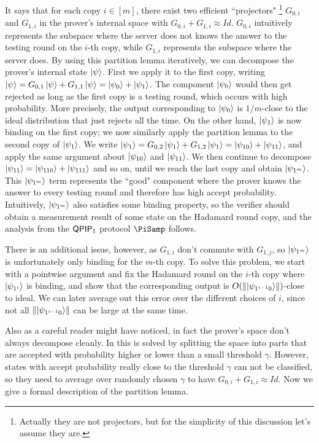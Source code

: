It says that for each copy $i\in[m]$, there exist two efficient ``projectors" \footnote{Actually they are not projectors, but for the simplicity of this discussion let's assume they are.} $G_{0,i}$ and $G_{1,i}$ in the prover's internal space with $G_{0,i}+G_{1,i} \approx Id$.
$G_{0,i}$ intuitively represents the subspace where the server does not knows the answer to the testing round on the $i$-th copy, while $G_{1,i}$ represents the subspace where the server does.
By using this partition lemma iteratively, we can decompose the prover's internal state $\ket{\psi}$.
First we apply it to the first copy, writing $\ket{\psi}=G_{0,1}\ket{\psi}+G_{1,1}\ket{\psi}=\ket{\psi_0}+\ket{\psi_1}$.
The component $\ket{\psi_0}$ would then get rejected as long as the first copy is a testing round,
which occurs with high probability.
More precisely, the output corresponding to $\ket{\psi_0}$ is $1/m$-close to the ideal distribution that just rejects all the time.
On the other hand, $\ket{\psi_1}$ is now binding on the first copy;
we now similarly apply the partition lemma to the second copy of $\ket{\psi_1}$.
We write $\ket{\psi_1}=G_{0,2}\ket{\psi_1}+G_{1,2}\ket{\psi_1}=\ket{\psi_{10}}+\ket{\psi_{11}}$, and apply the same argument about $\ket{\psi_{10}}$ and $\ket{\psi_{11}}$.
We then continue to decompose $\ket{\psi_{11}}=\ket{\psi_{110}}+\ket{\psi_{111}}$ and so on, until we reach the last copy and obtain $\ket{\psi_{1^m}}$.
This $\ket{\psi_{1^m}}$ term represents the ``good" component where the prover knows the answer to every testing round and therefore has high accept probability.
Intuitively, $\ket{\psi_{1^m}}$ also satisfies some binding property,
so the verifier should obtain a measurement result of some state on the Hadamard round copy,
and the analysis from the $\operatorname{\mathsf{QPIP}}_1$ protocol $\PiSamp$ follows.

There is an additional issue, however, as $G_{1,i}$ don't commute with $G_{1,j}$, so $\ket{\psi_{1^m}}$ is unfortunately only binding for the $m$-th copy.
To solve this problem, we start with a pointwise argument and fix the Hadamard round on the $i$-th copy where $\ket{\psi_{1^i}}$ is binding,
and show that the corresponding output is $O(\left\lVert\ket{\psi_{1^{i-1}0}}\right\rVert)$-close to ideal.
We can later average out this error over the different choices of $i$, since not all $\left\lVert\ket{\psi_{1^{i-1}0}}\right\rVert$ can be large at the same time.

Also as a careful reader might have noticed, in fact the prover's space don't always decompose cleanly. In \cite{arXiv:ChiaChungYam19} this is solved by splitting the space into parts that are accepted with probability higher or lower than a small threshold $\gamma$. However, states with accept probability really close to the threshold $\gamma$ can not be classified, so they need to average over randomly chosen $\gamma$ to have $G_{0,i}+G_{1,i} \approx Id$.
Now we give a formal description of the partition lemma.

